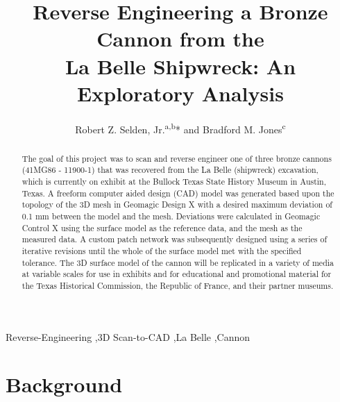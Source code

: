 \documentclass[review]{elsarticle}
\begin{document}
\begin{frontmatter}

\title{Reverse Engineering a Bronze Cannon from the\\La Belle Shipwreck: An Exploratory Analysis}

\author{Robert Z. Selden, Jr.\textsuperscript{a,b}* and Bradford M. Jones\textsuperscript{c}}
\address[1]{Heritage Research Center, Stephen F. Austin State University, USA}
\address[2]{Cultural Heritage Department, Jean Monnet University, FR}
\address[3]{Archeology Division, Texas Historical Commission, Austin, USA}

\begin{abstract}
The goal of this project was to scan and reverse engineer one of three bronze cannons (41MG86 - 11900-1) that was recovered from the La Belle (shipwreck) excavation, which is currently on exhibit at the Bullock Texas State History Museum in Austin, Texas. A freeform computer aided design (CAD) model was generated based upon the topology of the 3D mesh in Geomagic Design X with a desired maximum deviation of 0.1 mm between the model and the mesh. Deviations were calculated in Geomagic Control X using the surface model as the reference data, and the mesh as the measured data. A custom patch network was subsequently designed using a series of iterative revisions until the whole of the surface model met with the specified tolerance. The 3D surface model of the cannon will be replicated in a variety of media at variable scales for use in exhibits and for educational and promotional material for the Texas Historical Commission, the Republic of France, and their partner museums.
\end{abstract}

\begin{keyword}
Reverse-Engineering \sep 3D Scan-to-CAD \sep La Belle \sep Cannon


\end{keyword}

\end{frontmatter}

\linenumbers

\section*{Background}
\end{document}
